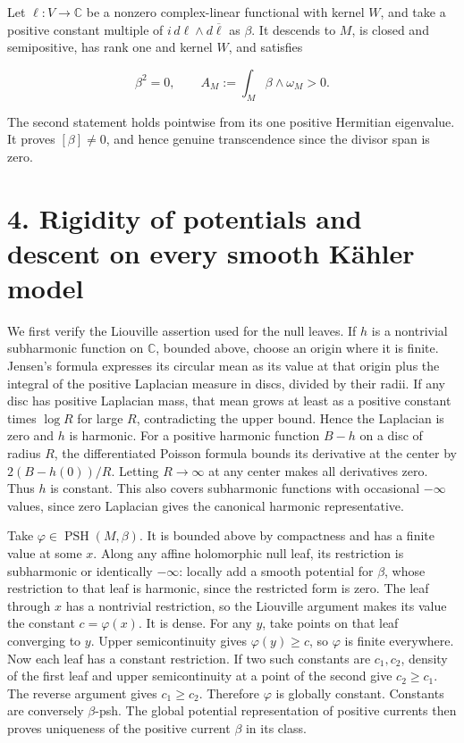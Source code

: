 \documentclass[11pt]{article}
\begin{document}
Let $\ell:V\to\mathbb C$ be a nonzero complex-\allowbreak{}linear functional with kernel $W$, and take a positive constant multiple of $i\,d\ell\wedge d\overline\ell$ as $\beta$. It descends to $M$, is closed and semipositive, has rank one and kernel $W$, and satisfies

\[\beta^2=0,\qquad A_M:=\int_M\beta\wedge\omega_M>0.\]

The second statement holds pointwise from its one positive Hermitian eigenvalue. It proves $[\beta]\ne0$, and hence genuine transcendence since the divisor span is zero.

\section*{4. Rigidity of potentials and descent on every smooth Kähler model}

We first verify the Liouville assertion used for the null leaves. If $h$ is a nontrivial subharmonic function on $\mathbb C$, bounded above, choose an origin where it is finite. Jensen's formula expresses its circular mean as its value at that origin plus the integral of the positive Laplacian measure in discs, divided by their radii. If any disc has positive Laplacian mass, that mean grows at least as a positive constant times $\log R$ for large $R$, contradicting the upper bound. Hence the Laplacian is zero and $h$ is harmonic. For a positive harmonic function $B-h$ on a disc of radius $R$, the differentiated Poisson formula bounds its derivative at the center by $2(B-h(0))/R$. Letting $R\to\infty$ at any center makes all derivatives zero. Thus $h$ is constant. This also covers subharmonic functions with occasional $-\infty$ values, since zero Laplacian gives the canonical harmonic representative.

Take $\varphi\in\operatorname{PSH}(M,\beta)$. It is bounded above by compactness and has a finite value at some $x$. Along any affine holomorphic null leaf, its restriction is subharmonic or identically $-\infty$: locally add a smooth potential for $\beta$, whose restriction to that leaf is harmonic, since the restricted form is zero. The leaf through $x$ has a nontrivial restriction, so the Liouville argument makes its value the constant $c=\varphi(x)$. It is dense. For any $y$, take points on that leaf converging to $y$. Upper semicontinuity gives $\varphi(y)\geq c$, so $\varphi$ is finite everywhere. Now each leaf has a constant restriction. If two such constants are $c_1,c_2$, density of the first leaf and upper semicontinuity at a point of the second give $c_2\geq c_1$. The reverse argument gives $c_1\geq c_2$. Therefore $\varphi$ is globally constant. Constants are conversely $\beta$-\allowbreak{}psh. The global potential representation of positive currents then proves uniqueness of the positive current $\beta$ in its class.
\end{document}
